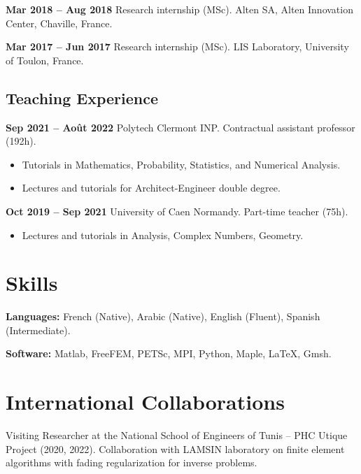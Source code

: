 \documentclass[10pt]{article}
\begin{document}
\medskip

\textbf{Mar 2018 -- Aug 2018} \quad Research internship (MSc). Alten SA, Alten Innovation Center, Chaville, France.  

\medskip

\textbf{Mar 2017 -- Jun 2017} \quad Research internship (MSc). LIS Laboratory, University of Toulon, France.  

\subsection{Teaching Experience}

\textbf{Sep 2021 -- Août 2022} \quad Polytech Clermont INP.  
Contractual assistant professor (192h).  
\begin{itemize}
  \item Tutorials in Mathematics, Probability, Statistics, and Numerical Analysis.
  \item Lectures and tutorials for Architect-Engineer double degree.
\end{itemize}

\textbf{Oct 2019 -- Sep 2021} \quad University of Caen Normandy.  
Part-time teacher (75h).  
\begin{itemize}
  \item Lectures and tutorials in Analysis, Complex Numbers, Geometry.
\end{itemize}

\section{Skills}
\textbf{Languages:} French (Native), Arabic (Native), English (Fluent), Spanish (Intermediate).  

\textbf{Software:} Matlab, FreeFEM, PETSc, MPI, Python, Maple, LaTeX, Gmsh.  

\section*{International Collaborations}
Visiting Researcher at the National School of Engineers of Tunis -- PHC Utique Project (2020, 2022).  
Collaboration with LAMSIN laboratory on finite element algorithms with fading regularization for inverse problems.

\end{document}
